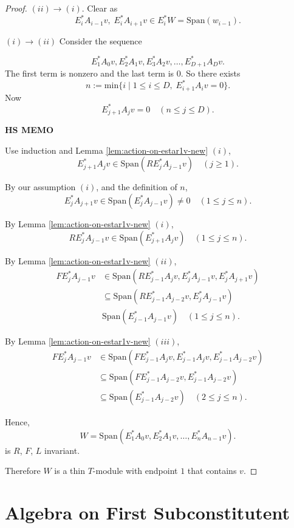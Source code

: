 \documentclass[
]{book}
\theoremstyle{definition}
\theoremstyle{definition}
\theoremstyle{definition}
\theoremstyle{definition}
\theoremstyle{remark}
\begin{document}
\begin{proof}
\((ii)\to(i)\). Clear as
\[E^*_iA_{i-1}v, \; E^*_iA_{i+1}v \in E^*_iW = \mathrm{Span}(w_{i-1}).\]

\((i)\to(ii)\) Consider the sequence

\[E^*_1A_{0}v, E^*_2A_1v, E^*_3A_2v, \ldots, E^*_{D+1}A_Dv.\]
The first term is nonzero and the last term is \(0\).
So there exists
\[n := \mathrm{min}\{i\mid 1\leq i\leq D, \; E^*_{i+1}A_iv = 0\}.\]
Now
\begin{equation}
E^*_{j+1}A_jv = 0 \quad (n\leq j\leq D). \label{eq:n}
\end{equation}

\textbf{HS MEMO}

Use induction and Lemma \ref{lem:action-on-estar1v-new} \((i)\),
\[E^*_{j+1}A_jv \in \mathrm{Span}(RE^*_jA_{j-1}v) \quad (j\geq 1).\]

By our assumption \((i)\), and the definition of \(n\),
\[E^*_jA_{j+1}v \in \mathrm{Span}(E^*_jA_{j-1}v)\neq 0 \quad (1\leq j\leq n).\]

By Lemma \ref{lem:action-on-estar1v-new} \((i)\),
\[RE^*_jA_{j-1}v \in \mathrm{Span}(E^*_{j+1}A_jv) \quad (1\leq j\leq n).\]

By Lemma \ref{lem:action-on-estar1v-new} \((ii)\),
\begin{align}
FE^*_jA_{j-1}v & \in \mathrm{Span}(RE^*_{j-1}A_jv, E^*_jA_{j-1}v, E^*_jA_{j+1}v)\\
& \subseteq \mathrm{Span}(RE^*_{j-1}A_{j-2}v, E^*_jA_{j-1}v)\\
& \mathrm{Span}(E^*_{j-1}A_{j-1}v) \quad (1\leq j\leq n).
\end{align}

By Lemma \ref{lem:action-on-estar1v-new} \((iii)\),
\begin{align}
FE^*_jA_{j-1}v & \in \mathrm{Span}(FE^*_{j-1}A_j v, E^*_{j-1}A_{j}v, E^*_{j-1}A_{j-2}v)\\
& \subseteq \mathrm{Span}(FE^*_{j-1}A_{j-2}v, E^*_{j-1}A_{j-2}v)\\
& \subseteq \mathrm{Span}(E^*_{j-1}A_{j-2}v) \quad (2\leq j\leq n).
\end{align}

Hence,
\[W = \mathrm{Span}(E^*_1A_0v, E^*_2A_1v, \ldots, E^*_nA_{n-1}v).\]
is \(R\), \(F\), \(L\) invariant.

Therefore \(W\) is a thin \(T\)-module with endpoint \(1\) that contains \(v\).
\end{proof}

\hypertarget{lec33}{%
\chapter{Algebra on First Subconstitutent}\label{lec33}}
\end{document}
